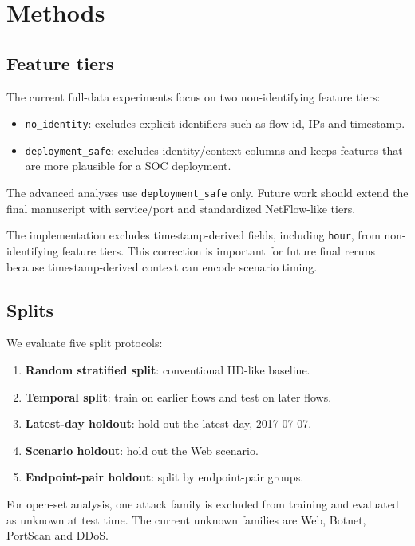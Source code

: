 \documentclass[11pt,a4paper]{article}
\begin{document}
\section{Methods}

\subsection{Feature tiers}

The current full-data experiments focus on two non-identifying feature tiers:
\begin{itemize}[leftmargin=*]
  \item \texttt{no\_identity}: excludes explicit identifiers such as flow id, IPs and timestamp.
  \item \texttt{deployment\_safe}: excludes identity/context columns and keeps features that are more plausible for a SOC deployment.
\end{itemize}

The advanced analyses use \texttt{deployment\_safe} only. Future work should extend the final manuscript with service/port and standardized NetFlow-like tiers.

The implementation excludes timestamp-derived fields, including \texttt{hour}, from non-identifying feature tiers. This correction is important for future final reruns because timestamp-derived context can encode scenario timing.

\subsection{Splits}

We evaluate five split protocols:
\begin{enumerate}[leftmargin=*]
  \item \textbf{Random stratified split}: conventional IID-like baseline.
  \item \textbf{Temporal split}: train on earlier flows and test on later flows.
  \item \textbf{Latest-day holdout}: hold out the latest day, 2017-07-07.
  \item \textbf{Scenario holdout}: hold out the Web scenario.
  \item \textbf{Endpoint-pair holdout}: split by endpoint-pair groups.
\end{enumerate}

For open-set analysis, one attack family is excluded from training and evaluated as unknown at test time. The current unknown families are Web, Botnet, PortScan and DDoS.
\end{document}
